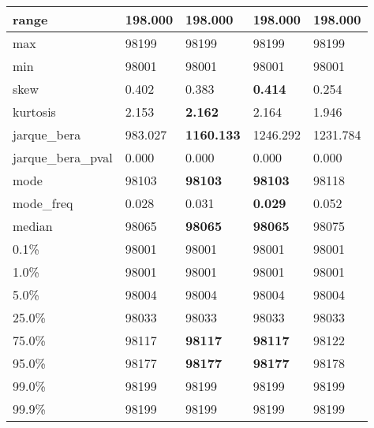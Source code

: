 \begin{table}[H]
\begin{tabular}{|l|m{10em}|m{10em}|m{10em}|m{10em}|}
\hline range & 198.000 & 198.000 & 198.000 & 198.000 \\
\hline max & 98199 & 98199 & 98199 & 98199 \\
\hline min & 98001 & 98001 & 98001 & 98001 \\
\hline skew & 0.402 & 0.383 & \bfseries 0.414 & \cellcolor[rgb]{0.9, 0.54, 0.52} 0.254 \\
\hline kurtosis & 2.153 & \bfseries 2.162 & 2.164 & \cellcolor[rgb]{0.9, 0.54, 0.52} 1.946 \\
\hline jarque\_bera & 983.027 & \bfseries 1160.133 & \cellcolor[rgb]{0.9, 0.54, 0.52} 1246.292 & 1231.784 \\
\hline jarque\_bera\_pval & 0.000 & 0.000 & 0.000 & 0.000 \\
\hline mode & 98103 & \bfseries 98103 & \bfseries 98103 & \cellcolor[rgb]{0.9, 0.54, 0.52} 98118 \\
\hline mode\_freq & 0.028 & 0.031 & \bfseries 0.029 & \cellcolor[rgb]{0.9, 0.54, 0.52} 0.052 \\
\hline median & 98065 & \bfseries 98065 & \bfseries 98065 & \cellcolor[rgb]{0.9, 0.54, 0.52} 98075 \\
\hline 0.1\% & 98001 & 98001 & 98001 & 98001 \\
\hline 1.0\% & 98001 & 98001 & 98001 & 98001 \\
\hline 5.0\% & 98004 & 98004 & 98004 & 98004 \\
\hline 25.0\% & 98033 & 98033 & 98033 & 98033 \\
\hline 75.0\% & 98117 & \bfseries 98117 & \bfseries 98117 & \cellcolor[rgb]{0.9, 0.54, 0.52} 98122 \\
\hline 95.0\% & 98177 & \bfseries 98177 & \bfseries 98177 & \cellcolor[rgb]{0.9, 0.54, 0.52} 98178 \\
\hline 99.0\% & 98199 & 98199 & 98199 & 98199 \\
\hline 99.9\% & 98199 & 98199 & 98199 & 98199 \\
\hline
\end{tabular}
\end{table}
